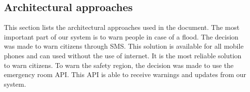 

\subsection{Architectural approaches}
This section lists the architectural approaches used in the document.
The most important part of our system is to warn people in case of a flood. The decision was made to warn citizens through SMS. This solution is available for all mobile phones and can used without the use of internet. It is the most reliable solution to warn citizens. To warn the safety region, the decision was made to use the emergency room API. This API is able to receive warnings and updates from our system. 

